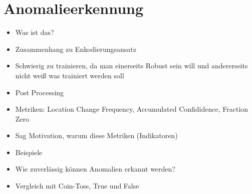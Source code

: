 \section{Anomalieerkennung}
\label{sec:eval_anomalieerkennung}
\begin{itemize}
    \item Was ist das?
    \item Zusammenhang zu Enkodierungsansatz
    \item Schwierig zu trainieren, da man einerseits Robust sein will und andererseits nicht weiß was trainiert werden soll
    \item Post Processing
    \item Metriken: Location Change Frequency, Accumulated Confididence, Fraction Zero
    \item Sag Motivation, warum diese Metriken (Indikatoren)
    \item Beispiele
    \item Wie zuverlässig können Anomalien erkannt werden?
    \item Vergleich mit Coin-Toss, True und False
\end{itemize}